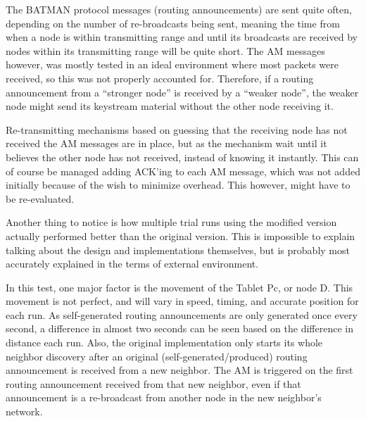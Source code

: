 The BATMAN protocol messages (routing announcements) are sent quite often,
depending on the number of re-broadcasts being sent, meaning the time from when
a node is within transmitting range and until its broadcasts are received by
nodes within its transmitting range will be quite short. The \ac{AM} messages
however, was mostly tested in an ideal environment where most packets were
received, so this was not properly accounted for. Therefore, if a routing
announcement from a ``stronger node'' is received by a ``weaker node'', the
weaker node might send its keystream material without the other node receiving
it.

Re-transmitting mechanisms based on guessing that the receiving node has not
received the \ac{AM} messages are in place, but as the mechanism wait until it
believes the other node has not received, instead of knowing it instantly. This
can of course be managed adding ACK'ing to each \ac{AM} message, which was not
added initially because of the wish to minimize overhead. This however, might
have to be re-evaluated.

Another thing to notice is how multiple trial runs using the modified version
actually performed better than the original version. This is impossible to
explain talking about the design and implementations themselves, but is probably
most accurately explained in the terms of external environment.

In this test, one major factor is the movement of the Tablet Pc, or node D. This
movement is not perfect, and will vary in speed, timing, and accurate position
for each run. As self-generated routing announcements are only generated once
every second, a difference in almost two seconds can be seen based on the
difference in distance each run. Also, the original implementation only starts
its whole neighbor discovery after an original (self-generated/produced)
routing announcement is received from a new neighbor. The \ac{AM} is triggered
on the first routing announcement received from that new neighbor, even if that
announcement is a re-broadcast from another node in the new neighbor's network.
